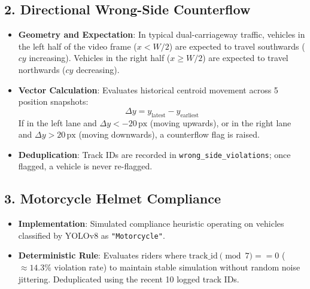 \subsection{2. Directional Wrong-Side Counterflow}
\begin{itemize}[leftmargin=*]
    \item \textbf{Geometry and Expectation}: In typical dual-carriageway traffic, vehicles in the left half of the video frame ($x < W/2$) are expected to travel southwards ($cy$ increasing). Vehicles in the right half ($x \ge W/2$) are expected to travel northwards ($cy$ decreasing).
    \item \textbf{Vector Calculation}: Evaluates historical centroid movement across 5 position snapshots:
    \begin{equation}
    \Delta y = y_{\text{latest}} - y_{\text{earliest}}
    \end{equation}
    If in the left lane and $\Delta y < -20\,\text{px}$ (moving upwards), or in the right lane and $\Delta y > 20\,\text{px}$ (moving downwards), a counterflow flag is raised.
    \item \textbf{Deduplication}: Track IDs are recorded in \texttt{wrong\_side\_violations}; once flagged, a vehicle is never re-flagged.
\end{itemize}

\subsection{3. Motorcycle Helmet Compliance}
\begin{itemize}[leftmargin=*]
    \item \textbf{Implementation}: Simulated compliance heuristic operating on vehicles classified by YOLOv8 as \texttt{"Motorcycle"}.
    \item \textbf{Deterministic Rule}: Evaluates riders where $\text{track\_id} \pmod 7 == 0$ ($\approx 14.3\%$ violation rate) to maintain stable simulation without random noise jittering. Deduplicated using the recent 10 logged track IDs.
\end{itemize}
